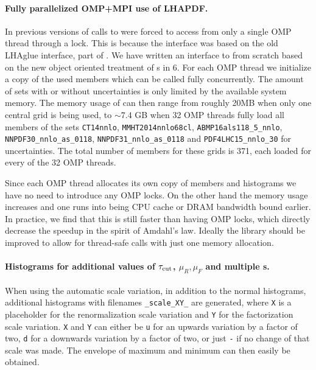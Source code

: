 \paragraph{Fully parallelized OMP+MPI use of LHAPDF.}

In previous versions of \MCFM{} calls to \LHAPDF{} were forced to access from only a single OMP thread
through a lock. This is because the interface was based on the old LHAglue interface, part
of \LHAPDF{}. We have written an interface to \LHAPDF{} from scratch based on the new object oriented treatment
of \PDF{}s in \LHAPDF{} 6. For each OMP thread we initialize a copy of the used \PDF{} members which
can be called fully concurrently. The amount of \PDF{} sets with or without \PDF{} uncertainties is only limited
by the available system memory. The memory usage of \MCFM{} can then range from roughly 20MB when only one central 
\PDF{} grid is being used, to $\sim 7.4$ GB when 32 OMP threads fully load
all members of the \PDF{} sets \texttt{CT14nnlo}, \texttt{MMHT2014nnlo68cl}, \texttt{ABMP16als118\_5\_nnlo},
 \texttt{NNPDF30\_nnlo\_as\_0118}, \texttt{NNPDF31\_nnlo\_as\_0118} and \texttt{PDF4LHC15\_nnlo\_30} for
 \PDF{} uncertainties. The total number of members for these grids is 371, each loaded for every of the
 32 OMP threads.
 
Since each OMP thread allocates its own copy of \PDF{} members and histograms we have no need to introduce
any OMP locks. On the other hand the memory usage increases and one runs into being CPU cache or DRAM
bandwidth bound earlier. In practice, we find that this is still faster than having OMP locks, which directly
decrease the speedup in the spirit of Amdahl's law. Ideally the \LHAPDF{} library should be improved to allow for 
thread-safe calls with just one memory allocation.

\paragraph{Histograms for additional values of $\tau_\text{cut}$, $\mu_R,\mu_F$ and multiple \PDF{}s.}
When using the automatic scale variation, in addition to the normal histograms, additional
histograms with filenames \texttt{\_scale\_XY\_} are generated, where \texttt{X} is a placeholder for the 
renormalization scale variation and \texttt{Y} for the factorization scale variation. \texttt{X} and \texttt{Y} can 
either be \texttt{u} for an upwards variation by a factor of two, \texttt{d} for a downwards variation by a factor of 
two, or just \texttt{-} if no change of that scale was made. The envelope of maximum and minimum can then easily be 
obtained.

